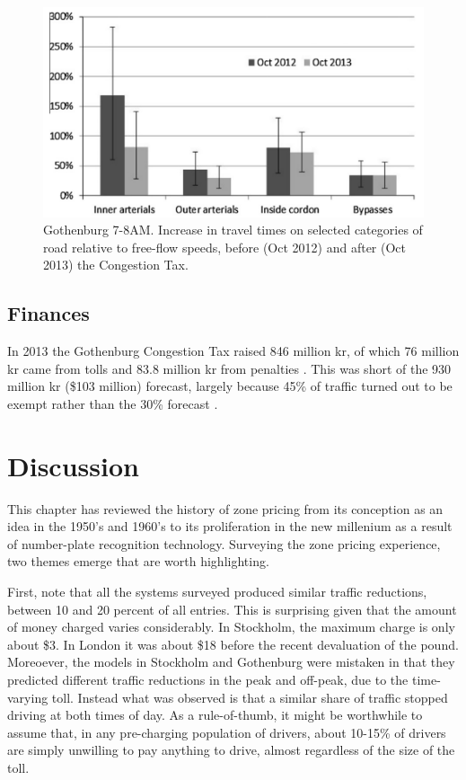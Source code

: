 \begin{figure}[ht]
\includegraphics[width=0.55\columnwidth]{../img/gburg-travel-times.png}

\caption{Gothenburg 7-8AM. Increase in travel times on selected categories of road relative to free-flow speeds, before (Oct 2012) and after (Oct 2013) the Congestion Tax. \citep{Borjesson2015} \label{fig:Gothenburg-travel-times}}

\end{figure}

\subsection{Finances}

In 2013 the Gothenburg Congestion Tax raised 846 million kr, of which 76 million kr came from tolls and 83.8 million kr from penalties \citep{TransportstyrelsenGburg2013}. This was short of the 930 million kr (\$103 million) forecast, largely because 45\% of traffic turned out to be exempt rather than the 30\% forecast \citep{Borjesson2015}.

\section{Discussion}\label{sec:discussion}

This chapter has reviewed the history of zone pricing from its conception as an idea in the 1950's and 1960's to its proliferation in the new millenium as a result of number-plate recognition technology. Surveying the zone pricing experience, two themes emerge that are worth highlighting.

First, note that all the systems surveyed produced similar traffic reductions, between 10 and 20 percent of all entries. This is surprising given that the amount of money charged varies considerably. In Stockholm, the maximum charge is only about \$3. In London it was about \$18 before the recent devaluation of the pound. Moreoever, the models in Stockholm and Gothenburg were mistaken in that they predicted different traffic reductions in the peak and off-peak, due to the time-varying toll. Instead what was observed is that a similar share of traffic stopped driving at both times of day. As a rule-of-thumb, it might be worthwhile to assume that, in any pre-charging population of drivers, about 10-15\% of drivers are simply unwilling to pay anything to drive, almost regardless of the size of the toll.


